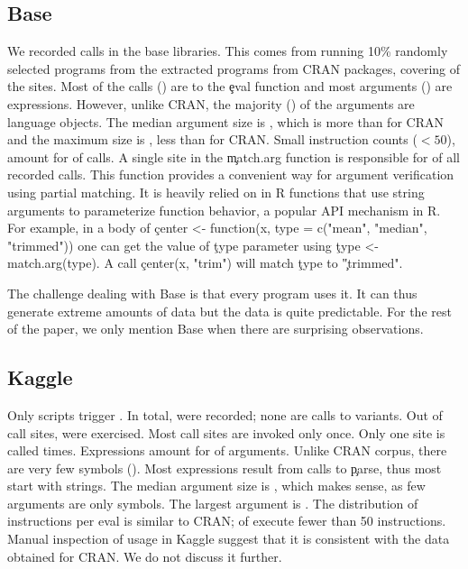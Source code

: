 \documentclass[review,nonacm,screen,acmsmall,anonymous=true]{acmart}
\begin{document}
\subsection{Base}

We recorded \baseAllcalls \eval calls in the \BasePackages base libraries. This
comes from running 10\% randomly selected programs from the
\CranRunnableScriptsRnd extracted programs from CRAN packages, covering
\baseTriggeredevalpct of the \BaseEvalCallSites sites. Most of the calls
(\baseEvalsratio) are to the \c{eval} function and most arguments
(\baseCodepercent) are expressions. However, unlike CRAN, the majority
(\baseLanguagepercent) of the arguments are language objects. The median
argument size is \baseMedianszeval, which is more than for CRAN and the maximum
size is \baseMaxszeval, less than for CRAN. Small instruction counts ($<50$),
amount for \baseSmalleventspct of calls. A single site in the \c{match.arg}
function is responsible for \baseTopFuncPercent of all recorded calls. This
function provides a convenient way for argument verification using partial
matching. It is heavily relied on in R functions that use string arguments to
parameterize function behavior, a popular API mechanism in R. For example, in a
body of \c{center <- function(x, type = c("mean", "median", "trimmed"))} one
can get the value of \c{type} parameter using \c{type <- match.arg(type)}. A
call \c{center(x, "trim")} will match \c{type} to \c{"trimmed"}.

The challenge dealing with Base is that every program uses it. It can thus
generate extreme amounts of data but the data is quite predictable. For the
rest of the paper, we only mention Base when there are surprising
observations.



\medskip

\subsection{Kaggle}
Only \kaggleNbruns scripts trigger \eval. In total, \kaggleAllcalls \eval were
recorded; none are calls to variants. Out of \kaggleStaticeval call sites,
\kaggleTriggeredeval were exercised. Most call sites are invoked only once. Only
one site is called \kaggleMaxcalls times. Expressions amount for
\kaggleCodepercent of arguments. Unlike CRAN corpus, there are very few symbols
(\kaggleSymbolpercent). Most expressions result from calls to \c{parse}, thus
most \evals start with strings. The median argument size is \kaggleMedianszeval,
which makes sense, as few arguments are only symbols. The largest argument is
\kaggleMaxszeval. The distribution of instructions per eval is similar to CRAN;
\kaggleSmalleventspct of \evals execute fewer than 50 instructions. Manual
inspection of \eval usage in Kaggle suggest that it is consistent with the data
obtained for CRAN. We do not discuss it further.
\end{document}

